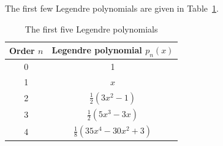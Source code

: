 \documentclass{article}
\begin{document}
The first few Legendre polynomials are given in Table~\ref{table:legendre}.

\begin{table}[h!]
\centering
\caption{The first five Legendre polynomials}
\renewcommand{\arraystretch}{2}
\begin{tabular}{|c|c|}
\hline
Order $n$ & Legendre polynomial $p_n(x)$            \\ \hline
0         & 1                                       \\ \hline
1         & $x$                                     \\ \hline
2         & $\frac{1}{2}\left(3x^2-1\right)$        \\ \hline
3         & $\frac{1}{2}\left(5x^3-3x\right)$       \\ \hline
4         & $\frac{1}{8}\left(35x^4-30x^2+3\right)$ \\ \hline
\end{tabular}\label{table:legendre}
\renewcommand{\arraystretch}{1}
\end{table}
\end{document}

